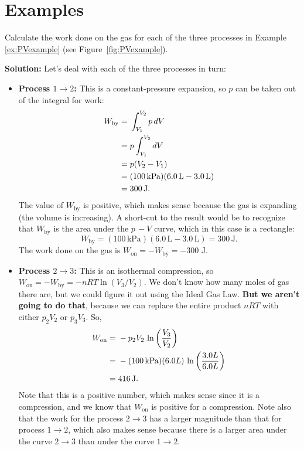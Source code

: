 \section{Examples}

\begin{example}
Calculate the work done on the gas for each of the three processes in
Example \ref{ex:PVexample} (see Figure~\ref{fig:PVexample}).

\textbf{Solution:} Let's deal with each of the three processes in turn:
\begin{itemize}
\item \textbf{Process $1 \rightarrow 2$:} This is a constant-pressure
  expansion, so $p$ can be taken out of the integral for work:
\begin{eqnarray}
W_\text{by}  =\mathstrut & \int_{V_1}^{V_2}p\,dV  \\
             =\mathstrut & p\int_{V_1}^{V_2} dV  \\
             =\mathstrut & p (V_2 - V_1)         \\
             =\mathstrut & (100\,\text{kPa})(6.0\,\text{L} - 3.0\,\text{L})  \\
             =\mathstrut & 300\,\text{J}.
\end{eqnarray}
The value of $W_\text{by}$ is positive, which makes sense because
the gas is expanding (the volume is increasing).
A short-cut to the result would be to recognize 
that $W_\text{by}$ 
is the area under the $p\,-V$ curve, which in this case is 
a rectangle:
\begin{equation}
W_\text{by} = (100\,\text{kPa})(6.0\,\text{L} - 3.0\,\text{L}) = 300\,\text{J}. 
\end{equation}
The work done on the gas is $W_\text{on} = -W_\text{by} = -300$ J.

\item \textbf{Process $2 \rightarrow 3$:} This is an isothermal
  compression, so $W_\text{on} = -W_\text{by} = -nRT\ln (V_3/V_2)$. We
  don't know how many moles of gas there are, but we could figure it
  out using the Ideal Gas Law.  \textbf{But we aren't going to do that},
  because we can replace the entire product $nRT$ with either $p_2V_2$ 
or $p_3V_3$. So,
\begin{eqnarray}
W_\text{on} =\mathstrut & -p_2V_2\, \ln\left(\frac{V_3}{V_2}\right)   \\
            =\mathstrut & -(100 \,\text{kPa})(6.0 L)\,\ln \left(\frac{3.0 L}{6.0 L}\right) 
                                                         \\
            =\mathstrut & 416 \,\text{J}.
\end{eqnarray}
 Note that this is a positive number, which makes sense
since it is a compression, and we know that $W_\text{on}$ is positive for a
compression.  Note also that the work for the  process $2 \rightarrow 3$ 
has a larger magnitude than that for process $1 \rightarrow 2$, which also
makes sense because there is a larger area under the curve $2 \rightarrow 3$
than under the curve $1 \rightarrow 2$.


\end{itemize}
\end{example}
